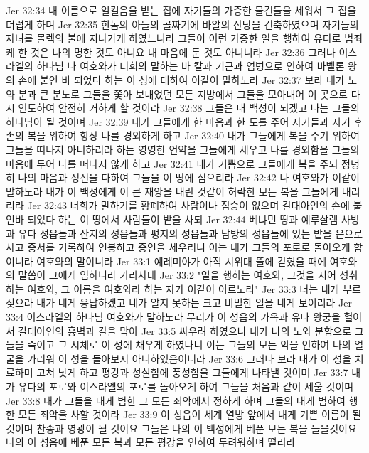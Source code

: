 Jer 32:34  내 이름으로 일컬음을 받는 집에 자기들의 가증한 물건들을 세워서 그 집을 더럽게 하며
Jer 32:35  힌놈의 아들의 골짜기에 바알의 산당을 건축하였으며 자기들의 자녀를 몰렉의 불에 지나가게 하였느니라 그들이 이런 가증한 일을 행하여 유다로 범죄케 한 것은 나의 명한 것도 아니요 내 마음에 둔 것도 아니니라
Jer 32:36  그러나 이스라엘의 하나님 나 여호와가 너희의 말하는 바 칼과 기근과 염병으로 인하여 바벨론 왕의 손에 붙인 바 되었다 하는 이 성에 대하여 이같이 말하노라
Jer 32:37  보라 내가 노와 분과 큰 분노로 그들을 쫓아 보내었던 모든 지방에서 그들을 모아내어 이 곳으로 다시 인도하여 안전히 거하게 할 것이라
Jer 32:38  그들은 내 백성이 되겠고 나는 그들의 하나님이 될 것이며
Jer 32:39  내가 그들에게 한 마음과 한 도를 주어 자기들과 자기 후손의 복을 위하여 항상 나를 경외하게 하고
Jer 32:40  내가 그들에게 복을 주기 위하여 그들을 떠나지 아니하리라 하는 영영한 언약을 그들에게 세우고 나를 경외함을 그들의 마음에 두어 나를 떠나지 않게 하고
Jer 32:41  내가 기쁨으로 그들에게 복을 주되 정녕히 나의 마음과 정신을 다하여 그들을 이 땅에 심으리라
Jer 32:42  나 여호와가 이같이 말하노라 내가 이 백성에게 이 큰 재앙을 내린 것같이 허락한 모든 복을 그들에게 내리리라
Jer 32:43  너희가 말하기를 황폐하여 사람이나 짐승이 없으며 갈대아인의 손에 붙인바 되었다 하는 이 땅에서 사람들이 밭을 사되
Jer 32:44  베냐민 땅과 예루살렘 사방과 유다 성읍들과 산지의 성읍들과 평지의 성읍들과 남방의 성읍들에 있는 밭을 은으로 사고 증서를 기록하여 인봉하고 증인을 세우리니 이는 내가 그들의 포로로 돌아오게 함이니라 여호와의 말이니라
Jer 33:1  예레미야가 아직 시위대 뜰에 갇혔을 때에 여호와의 말씀이 그에게 임하니라 가라사대
Jer 33:2  "일을 행하는 여호와, 그것을 지어 성취하는 여호와, 그 이름을 여호와라 하는 자가 이같이 이르노라"
Jer 33:3  너는 내게 부르짖으라 내가 네게 응답하겠고 네가 알지 못하는 크고 비밀한 일을 네게 보이리라
Jer 33:4  이스라엘의 하나님 여호와가 말하노라 무리가 이 성읍의 가옥과 유다 왕궁을 헐어서 갈대아인의 흉벽과 칼을 막아
Jer 33:5  싸우려 하였으나 내가 나의 노와 분함으로 그들을 죽이고 그 시체로 이 성에 채우게 하였나니 이는 그들의 모든 악을 인하여 나의 얼굴을 가리워 이 성을 돌아보지 아니하였음이니라
Jer 33:6  그러나 보라 내가 이 성을 치료하며 고쳐 낫게 하고 평강과 성실함에 풍성함을 그들에게 나타낼 것이며
Jer 33:7  내가 유다의 포로와 이스라엘의 포로를 돌아오게 하여 그들을 처음과 같이 세울 것이며
Jer 33:8  내가 그들을 내게 범한 그 모든 죄악에서 정하게 하며 그들의 내게 범하여 행한 모든 죄악을 사할 것이라
Jer 33:9  이 성읍이 세계 열방 앞에서 내게 기쁜 이름이 될 것이며 찬송과 영광이 될 것이요 그들은 나의 이 백성에게 베푼 모든 복을 들을것이요 나의 이 성읍에 베푼 모든 복과 모든 평강을 인하여 두려워하며 떨리라
